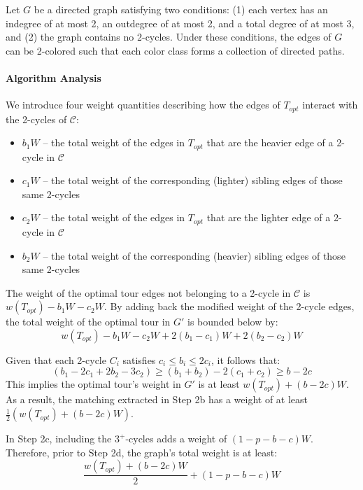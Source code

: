 \begin{lemma} \label{lemma:path_coloring}
Let $G$ be a directed graph satisfying two conditions: (1) each vertex has an
indegree of at most 2, an outdegree of at most 2, and a total degree of at most
3, and (2) the graph contains no 2-cycles. Under these conditions, the edges of
$G$ can be 2-colored such that each color class forms a collection of directed
paths.
\end{lemma}

\paragraph{Algorithm Analysis}
We introduce four weight quantities describing how the edges of $T_{opt}$
interact with the 2-cycles of $\mathcal{C}$:
\begin{itemize}
    \item $b_1 W$ -- the total weight of the edges in $T_{opt}$ that are the
    heavier edge of a 2-cycle in $\mathcal{C}$
    \item $c_1 W$ -- the total weight of the corresponding (lighter) sibling
    edges of those same 2-cycles
    \item $c_2 W$ -- the total weight of the edges in $T_{opt}$ that are the
    lighter edge of a 2-cycle in $\mathcal{C}$
    \item $b_2 W$ -- the total weight of the corresponding (heavier) sibling
    edges of those same 2-cycles
\end{itemize}

The weight of the optimal tour edges not belonging to a 2-cycle in $\mathcal{C}$
is $w(T_{opt}) - b_1W - c_2W$. By adding back the modified weight of the 2-cycle
edges, the total weight of the optimal tour in $G'$ is bounded below by:
$$w(T_{opt}) - b_1W - c_2W + 2(b_1 - c_1)W + 2(b_2 - c_2)W$$

Given that each 2-cycle $C_i$ satisfies $c_i \le b_i \le 2c_i$, it follows that:
$$(b_1 - 2c_1 + 2b_2 - 3c_2) \ge (b_1 + b_2) - 2(c_1 + c_2) \ge b - 2c$$
This implies the optimal tour's weight in $G'$ is at least $w(T_{opt}) + (b -
2c)W$. As a result, the matching extracted in Step 2b has a weight of at least
$\frac{1}{2}(w(T_{opt}) + (b - 2c)W)$.

In Step 2c, including the $3^+$-cycles adds a weight of $(1 - p - b - c)W$.
Therefore, prior to Step 2d, the graph's total weight is at least:
\begin{equation} \label{eq:weight_before_contraction_real}
\frac{w(T_{opt}) + (b - 2c)W}{2} + (1 - p - b - c)W
\end{equation}

